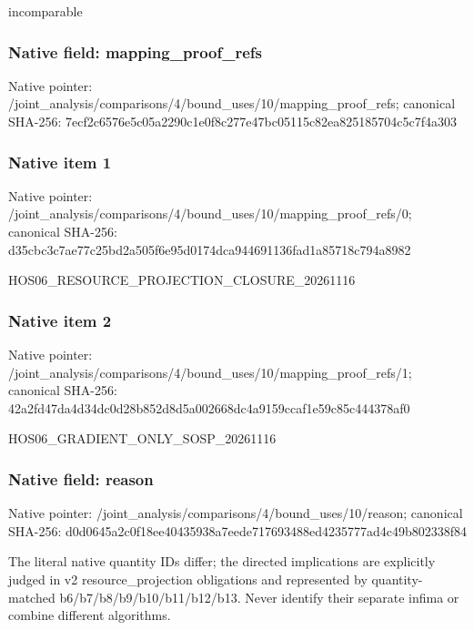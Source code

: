 \documentclass[10pt,a4paper]{article}
\begin{document}
\begingroup\raggedright\sloppy incomparable\par\endgroup

\subsubsection{Native field: mapping\_\allowbreak{}proof\_\allowbreak{}refs}
Native pointer: /joint\_\allowbreak{}analysis/comparisons/4/bound\_\allowbreak{}uses/10/mapping\_\allowbreak{}proof\_\allowbreak{}refs; canonical SHA-256: 7ecf2c6576e5c05a2290c1e0f8c277e47bc05115c82ea825185704c5c7f4a303

\subsubsection{Native item 1}
Native pointer: /joint\_\allowbreak{}analysis/comparisons/4/bound\_\allowbreak{}uses/10/mapping\_\allowbreak{}proof\_\allowbreak{}refs/0; canonical SHA-256: d35cbc3c7ae77c25bd2a505f6e95d0174dca944691136fad1a85718c794a8982

\begingroup\raggedright\sloppy HOS06\_\allowbreak{}RESOURCE\_\allowbreak{}PROJECTION\_\allowbreak{}CLOSURE\_\allowbreak{}20261116\par\endgroup

\subsubsection{Native item 2}
Native pointer: /joint\_\allowbreak{}analysis/comparisons/4/bound\_\allowbreak{}uses/10/mapping\_\allowbreak{}proof\_\allowbreak{}refs/1; canonical SHA-256: 42a2fd47da4d34dc0d28b852d8d5a002668dc4a9159ccaf1e59c85c444378af0

\begingroup\raggedright\sloppy HOS06\_\allowbreak{}GRADIENT\_\allowbreak{}ONLY\_\allowbreak{}SOSP\_\allowbreak{}20261116\par\endgroup

\subsubsection{Native field: reason}
Native pointer: /joint\_\allowbreak{}analysis/comparisons/4/bound\_\allowbreak{}uses/10/reason; canonical SHA-256: d0d0645a2c0f18ee40435938a7eede717693488ed4235777ad4c49b802338f84

\begingroup\raggedright\sloppy The literal native quantity IDs differ;\allowbreak{} the directed implications are explicitly judged in v2 resource\_\allowbreak{}projection obligations and represented by quantity-matched b6/\allowbreak{}b7/\allowbreak{}b8/\allowbreak{}b9/\allowbreak{}b10/\allowbreak{}b11/\allowbreak{}b12/\allowbreak{}b13. Never identify their separate infima or combine different algorithms.\par\endgroup
\end{document}
